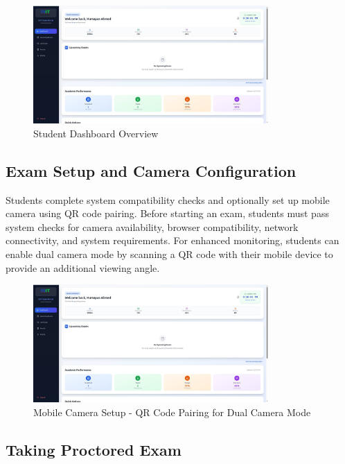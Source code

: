 \begin{figure}[p]
    \centering
    \includegraphics[width=0.8\textwidth]{Chap4/student_dashboard_overview.jpg}
    \caption{Student Dashboard Overview}
    \label{fig:student_dashboard}
\end{figure}

\subsection{Exam Setup and Camera Configuration}

Students complete system compatibility checks and optionally set up mobile camera using QR code pairing. Before starting an exam, students must pass system checks for camera availability, browser compatibility, network connectivity, and system requirements. For enhanced monitoring, students can enable dual camera mode by scanning a QR code with their mobile device to provide an additional viewing angle.

\begin{figure}[p]
    \centering
    \includegraphics[width=0.8\textwidth]{Chap4/student_mobile_camera_setup.jpg}
    \caption{Mobile Camera Setup - QR Code Pairing for Dual Camera Mode}
    \label{fig:student_camera}
\end{figure}

\subsection{Taking Proctored Exam}

